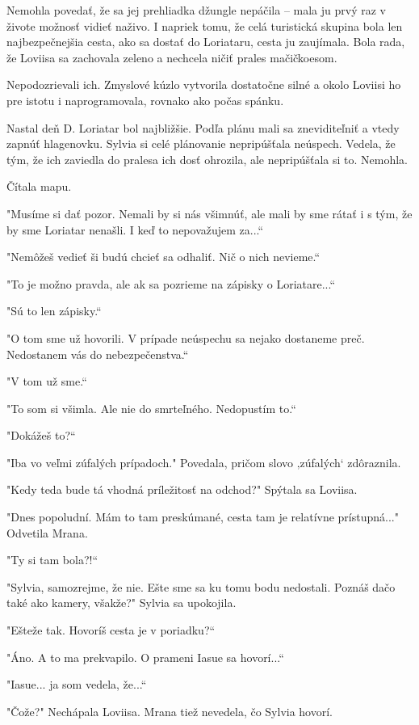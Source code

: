 \documentclass{book}
\begin{document}
Nemohla povedať, že sa jej prehliadka džungle nepáčila – mala ju prvý raz v živote možnosť vidieť naživo. I napriek tomu, že celá turistická skupina bola len najbezpečnejšia cesta, ako sa dostať do Loriataru, cesta ju zaujímala. Bola rada, že Loviisa sa zachovala zeleno a nechcela ničiť prales mačičkoesom.

Nepodozrievali ich. Zmyslové kúzlo vytvorila dostatočne silné a okolo Loviisi ho pre istotu i naprogramovala, rovnako ako počas spánku.

Nastal deň D. Loriatar bol najbližšie. Podľa plánu mali sa zneviditeľniť a vtedy zapnúť hlagenovku. Sylvia si celé plánovanie nepripúšťala neúspech. Vedela, že tým, že ich zaviedla do pralesa ich dosť ohrozila, ale nepripúšťala si to. Nemohla.

Čítala mapu.

"$ $Musíme si dať pozor. Nemali by si nás všimnúť, ale mali by sme rátať i s tým, že by sme Loriatar nenašli. I keď to nepovažujem za...“

"$ $Nemôžeš vedieť ši budú chcieť sa odhaliť. Nič o nich nevieme.“

"$ $To je možno pravda, ale ak sa pozrieme na zápisky o Loriatare...“

"$ $Sú to len zápisky.“

"$ $O tom sme už hovorili. V prípade neúspechu sa nejako dostaneme preč. Nedostanem vás do nebezpečenstva.“

"$ $V tom už sme.“

"$ $To som si všimla. Ale nie do smrteľného. Nedopustím to.“

"$ $Dokážeš to?“

"$ $Iba vo veľmi zúfalých prípadoch."$ $ Povedala, pričom slovo ‚zúfalých‘ zdôraznila.

"$ $Kedy teda bude tá vhodná príležitosť na odchod?"$ $ Spýtala sa Loviisa.

"$ $Dnes popoludní. Mám to tam preskúmané, cesta tam je relatívne prístupná..."$ $ Odvetila Mrana.

"$ $Ty si tam bola?!“

"$ $Sylvia, samozrejme, že nie. Ešte sme sa ku tomu bodu nedostali. Poznáš dačo také ako kamery, všakže?"$ $ Sylvia sa upokojila.

"$ $Ešteže tak. Hovoríš cesta je v poriadku?“

"$ $Áno. A to ma prekvapilo. O prameni Iasue sa hovorí...“

"$ $Iasue... ja som vedela, že...“

"$ $Čože?"$ $ Nechápala Loviisa. Mrana tiež nevedela, čo Sylvia hovorí.
\end{document}
